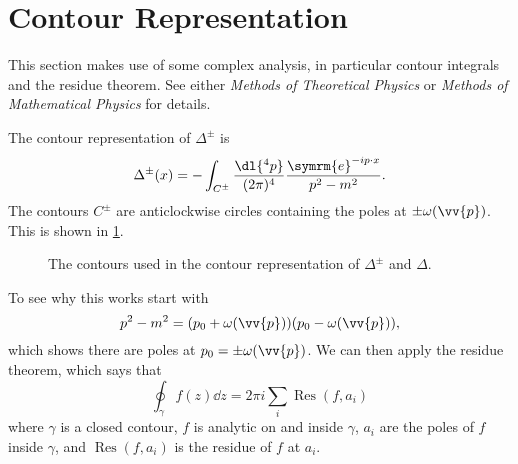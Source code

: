\documentclass[fleqn]{NotesClass}
\newcommand*{\course}[1]{\textit{#1}}
\newcommand{\e}{\symrm{e}}
\let\Re\relax
\let\Im\relax
\DeclareMathOperator{\Re}{Re}
\DeclareMathOperator{\Im}{Im}
\DeclareMathOperator{\Res}{Res}
\begin{document}
    \section{Contour Representation}\label{sec:contour representation}
    \begin{rmk}
        This section makes use of some complex analysis, in particular contour integrals and the residue theorem.
        See either \course{Methods of Theoretical Physics} or \course{Methods of Mathematical Physics} for details.
    \end{rmk}
    
    The contour representation of \(\Delta^{\pm}\) is
    \begin{equation}
        \Delta^{\pm}(x) = - \int_{C^{\pm}} \frac{\dl{^4p}}{(2\pi)^4} \frac{\e^{-ip\cdot x}}{p^2 - m^2}.
    \end{equation}
    The contours \(C^{\pm}\) are anticlockwise circles containing the poles at \(\pm\omega(\vv{p})\).
    This is shown in \cref{fig:contours for Delta}.
    
    \begin{figure}
        \caption{The contours used in the contour representation of \(\Delta^{\pm}\) and \(\Delta\).}
        \label{fig:contours for Delta}
    \end{figure}
    
    To see why this works start with
    \begin{equation}
        p^2 - m^2 = (p_0 + \omega(\vv{p})) (p_0 - \omega(\vv{p})),
    \end{equation}
    which shows there are poles at \(p_0 = \pm \omega(\vv{p})\).
    We can then apply the residue theorem, which says that 
    \begin{equation}
        \oint_\gamma f(z) \dd{z} = 2\pi i \sum_i \Res(f, a_i)
    \end{equation}
    where \(\gamma\) is a closed contour, \(f\) is analytic on and inside \(\gamma\), \(a_i\) are the poles of \(f\) inside \(\gamma\), and \(\Res(f, a_i)\) is the residue of \(f\) at \(a_i\).
    
\end{document}
